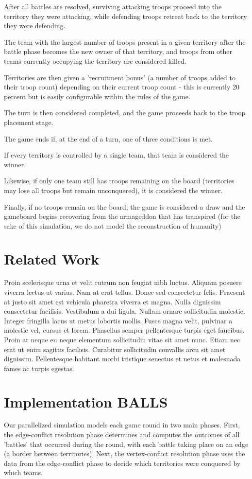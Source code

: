 \documentclass[10pt]{article}
\begin{document}
\begin{multicols}{2}
		After all battles are resolved, surviving attacking troops proceed into the territory they were attacking, while defending troops retreat back to the territory they were defending. 

		The team with the largest number of troops present in a given territory after the battle phase becomes the new owner of that territory, and troops from other teams currently occupying the territory are considered killed.

		Territories are then given a 'recruitment bonus' (a number of troops added to their troop count) depending on their current troop count - this is currently 20 percent but is easily configurable within the rules of the game.

		The turn is then considered completed, and the game proceeds back to the troop placement stage.

		The game ends if, at the end of a turn, one of three conditions is met. 

		If every territory is controlled by a single team, that team is considered the winner. 

		Likewise, if only one team still has troops remaining on the board (territories may lose all troops but remain unconquered), it is considered the winner.

		Finally, if no troops remain on the board, the game is considered a draw and the gameboard begins recovering from the armageddon that has transpired (for the sake of this simulation, we do not model the reconstruction of humanity)

		\section*{Related Work}
		Proin scelerisque urna et velit rutrum non feugiat nibh luctus. Aliquam posuere viverra lectus ut varius. Nam at erat tellus. Donec sed consectetur felis. Praesent at justo sit amet est vehicula pharetra viverra et magna. Nulla dignissim consectetur facilisis. Vestibulum a dui ligula. Nullam ornare sollicitudin molestie. Integer fringilla lacus ut metus lobortis mollis. Fusce magna velit, pulvinar a molestie vel, cursus et lorem. Phasellus semper pellentesque turpis eget faucibus. Proin at neque eu neque elementum sollicitudin vitae sit amet nunc. Etiam nec erat ut enim sagittis facilisis. Curabitur sollicitudin convallis arcu sit amet dignissim. Pellentesque habitant morbi tristique senectus et netus et malesuada fames ac turpis egestas.

		\section*{Implementation BALLS}
		Our parallelized simulation models each game round in two main phases. 
		First, the edge-conflict resolution phase determines and computes the outcomes of all 'battles' that occurred during the round, with each battle taking place on an edge (a border between territories). 
		Next, the vertex-conflict resolution phase uses the data from the edge-conflict phase to decide which territories were conquered by which teams. 
		

\end{multicols}
\end{document}
